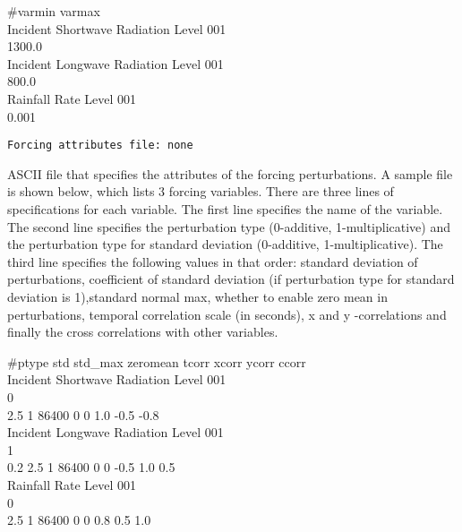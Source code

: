    \#varmin  varmax                       \\
   \indent Incident Shortwave Radiation Level 001 \\
         1300.0                        \\
   \indent Incident Longwave Radiation Level 001  \\
       800.0                         \\
   \indent Rainfall Rate Level 001                \\
         0.001
 

 \begin{Verbatim}[frame=single]
Forcing attributes file: none
 \end{Verbatim}

 
  ASCII file that
 specifies the attributes of the forcing perturbations. 
 A sample file is shown below, which lists 3 forcing 
 variables. There are three lines of specifications for 
 each variable. The first line specifies the name of the 
 variable. The second line specifies the perturbation type
 (0-additive, 1-multiplicative) and the perturbation type 
 for standard deviation (0-additive, 1-multiplicative). The 
 third line specifies the following values in that order: 
 standard deviation of perturbations, coefficient of 
 standard deviation (if perturbation type for standard 
 deviation is 1),standard normal max, whether to enable
 zero mean in perturbations, temporal correlation scale 
 (in seconds), x and y -correlations and finally the cross
 correlations with other variables. 

 \#ptype   std    std\_max   zeromean  tcorr  xcorr ycorr ccorr \\
 \indent Incident Shortwave Radiation Level 001                 \\
   0                                                   \\
      2.5     1     86400     0     0     1.0  -0.5  -0.8 \\
 \indent Incident Longwave Radiation Level 001                        \\
   1                                                         \\
      0.2     2.5   1   86400  0    0    -0.5   1.0  0.5  \\
 \indent Rainfall Rate Level 001                                      \\
   0                                                         \\
      2.5     1       86400  0     0     0.8   0.5  1.0
 

